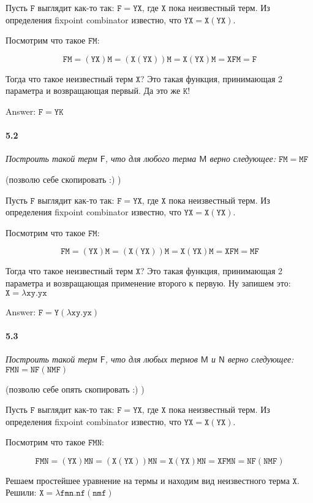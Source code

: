\documentclass[russian]{article}
\begin{document}
Пусть $\mathtt{F}$ выглядит как-то так: $\mathtt{F = YX}$, где $\mathtt{X}$ пока неизвестный терм. Из определения fixpoint combinator известно, что $\mathtt{YX = X(YX)}$.

Посмотрим что такое $\mathtt{FM}$: 

\[
\mathtt{FM = (YX)M = (X(YX))M = X(YX)M = XFM = F}
\]

Тогда что такое неизвестный терм $\mathtt{X}$? Это такая функция, принимающая 2 параметра и возвращающая первый. Да это же $\mathtt{K}$!

Answer: $\mathtt{F = YK}$

\paragraph*{5.2} \textit{Построить такой терм $\mathsf{F}$, что для любого терма $\mathsf{M}$ верно следующее: $\mathtt{FM = MF}$}

(позволю себе скопировать :) )

Пусть $\mathtt{F}$ выглядит как-то так: $\mathtt{F = YX}$, где $\mathtt{X}$ пока неизвестный терм. Из определения fixpoint combinator известно, что $\mathtt{YX = X(YX)}$.

Посмотрим что такое $\mathtt{FM}$: 

\[
\mathtt{FM = (YX)M = (X(YX))M = X(YX)M = XFM = MF}
\]

Тогда что такое неизвестный терм $\mathtt{X}$? Это такая функция, принимающая 2 параметра и возвращающая применение второго к первую. Ну запишем это: $\mathtt{X = \lambda xy.yx}$

Answer: $\mathtt{F = Y(\lambda xy.yx)}$

\paragraph*{5.3} \textit{Построить такой терм $\mathsf{F}$, что для любых термов $\mathsf{M}$ и $\mathsf{N}$ верно следующее: $\mathtt{FMN = NF(NMF)}$}

(позволю себе опять скопировать :) )

Пусть $\mathtt{F}$ выглядит как-то так: $\mathtt{F = YX}$, где $\mathtt{X}$ пока неизвестный терм. Из определения fixpoint combinator известно, что $\mathtt{YX = X(YX)}$.

Посмотрим что такое $\mathtt{FMN}$: 

\[
\mathtt{FMN = (YX)MN = (X(YX))MN = X(YX)MN = XFMN = NF(NMF)}
\]

Решаем простейшее уравнение на термы и находим вид неизвестного терма $\mathtt{X}$. Решили: $\mathtt{X = \lambda fmn.nf(nmf)}$
\end{document}
